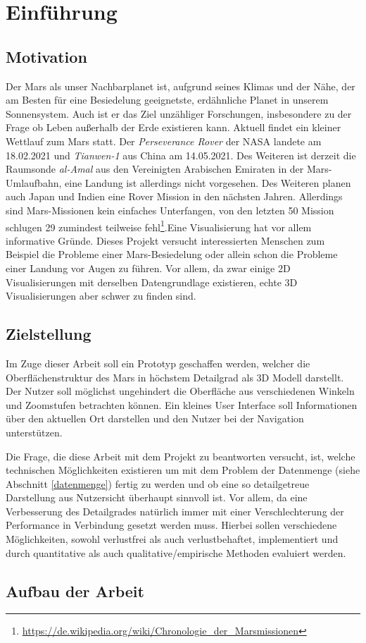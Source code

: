 \chapter{Einführung}

\section{Motivation}
Der Mars als unser Nachbarplanet ist, aufgrund seines Klimas und der Nähe, der am Besten für eine Besiedelung geeignetste, erdähnliche Planet in unserem Sonnensystem. Auch ist er das Ziel unzähliger Forschungen, insbesondere zu der Frage ob Leben außerhalb der Erde existieren kann. Aktuell findet ein kleiner Wettlauf zum Mars statt. Der \textit{Perseverance Rover} der NASA landete am 18.02.2021 und \textit{Tianwen-1} aus China am 14.05.2021. Des Weiteren ist derzeit die Raumsonde \textit{al-Amal} aus den Vereinigten Arabischen Emiraten in der Mars-Umlaufbahn, eine Landung ist allerdings nicht vorgesehen. Des Weiteren planen auch Japan und Indien eine Rover Mission in den nächsten Jahren. Allerdings sind Mars-Missionen kein einfaches Unterfangen, von den letzten 50 Mission schlugen 29 zumindest teilweise fehl\footnote{\url{https://de.wikipedia.org/wiki/Chronologie_der_Marsmissionen}}.Eine Visualisierung hat vor allem informative Gründe. Dieses Projekt versucht interessierten Menschen zum Beispiel die Probleme einer Mars-Besiedelung oder allein schon die Probleme einer Landung vor Augen zu führen. Vor allem, da zwar einige 2D Visualisierungen mit derselben Datengrundlage existieren, echte 3D Visualisierungen aber schwer zu finden sind.

\section{Zielstellung}
Im Zuge dieser Arbeit soll ein Prototyp geschaffen werden, welcher die Oberflächenstruktur des Mars in höchstem Detailgrad als 3D Modell darstellt. Der Nutzer soll möglichst ungehindert die Oberfläche aus verschiedenen Winkeln und Zoomstufen betrachten können. Ein kleines User Interface soll Informationen über den aktuellen Ort darstellen und den Nutzer bei der Navigation unterstützen.

Die Frage, die diese Arbeit mit dem Projekt zu beantworten versucht, ist, welche technischen Möglichkeiten existieren um mit dem Problem der Datenmenge (siehe Abschnitt \ref{datenmenge}) fertig zu werden und ob eine so detailgetreue Darstellung aus Nutzersicht überhaupt sinnvoll ist. Vor allem, da eine Verbesserung des Detailgrades natürlich immer mit einer Verschlechterung der Performance in Verbindung gesetzt werden muss. Hierbei sollen verschiedene Möglichkeiten, sowohl verlustfrei als auch verlustbehaftet, implementiert und durch quantitative als auch qualitative/empirische Methoden evaluiert werden.

\section{Aufbau der Arbeit}
